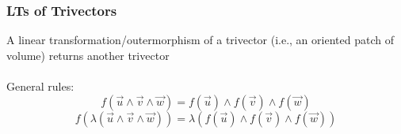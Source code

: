 \documentclass[a4paper]{article}
\begin{document}
\subsubsection*{LTs of Trivectors}
A linear transformation/outermorphism of a trivector (i.e., an oriented patch of volume) returns another trivector
\\
\\
General rules:
    \begin{equation}
        f(\vec{u} \wedge \vec{v} \wedge \vec{w}) = f(\vec{u}) \wedge f(\vec{v}) \wedge f(\vec{w})
    \end{equation}
    \begin{equation}
        f(\lambda(\vec{u} \wedge \vec{v} \wedge \vec{w})) = \lambda(f(\vec{u}) \wedge f(\vec{v}) \wedge f(\vec{w}))
    \end{equation}
\end{document}
